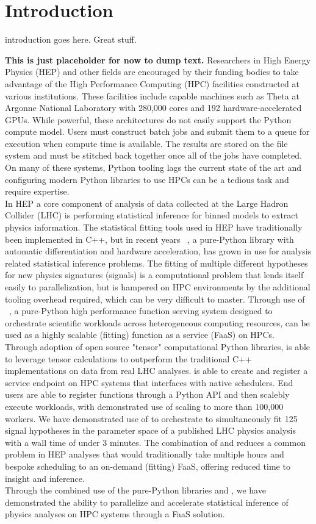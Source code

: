 \section{Introduction}\label{sec:introduction}
introduction goes here.
Great stuff.~\cite{ATL-PHYS-PUB-2019-029}

\textbf{This is just placeholder for now to dump text.}
Researchers in High Energy Physics (HEP) and other fields are encouraged by their funding bodies to take advantage of the High Performance Computing (HPC) facilities constructed at various institutions.
These facilities include capable machines such as Theta at Argonne National Laboratory with 280,000 cores and 192 hardware-accelerated GPUs.
While powerful, these architectures do not easily support the Python compute model.
Users must construct batch jobs and submit them to a queue for execution when compute time is available.
The results are stored on the file system and must be stitched back together once all of the jobs have completed.
On many of these systems, Python tooling lags the current state of the art and configuring modern Python libraries to use HPCs can be a tedious task and require expertise.\\

In HEP a core component of analysis of data collected at the Large Hadron Collider (LHC) is performing statistical inference for binned models to extract physics information.
The statistical fitting tools used in HEP have traditionally been implemented in C++, but in recent years \pyhf{}~\cite{pyhf,pyhf_joss}, a pure-Python library with automatic differentiation and hardware acceleration, has grown in use for analysis related statistical inference problems.
The fitting of multiple different hypotheses for new physics signatures (signals) is a computational problem that lends itself easily to parallelization, but is hampered on HPC environments by the additional tooling overhead required, which can be very difficult to master.
Through use of \funcX{}~\cite{funcX_paper}, a pure-Python high performance function serving system designed to orchestrate scientific workloads across heterogeneous computing resources, \pyhf{} can be used as a highly scalable (fitting) function as a service (FaaS) on HPCs.\\

Through adoption of open source "tensor" computational Python libraries, \pyhf{} is able to leverage tensor calculations to outperform the traditional C++ implementations on data from real LHC analyses.
\funcX{} is able to create and register a service endpoint on HPC systems that interfaces with native schedulers.
End users are able to register functions through a Python API and then scalebly execute workloads, with demonstrated use of scaling to more than 100,000 workers.
We have demonstrated use of \funcX{} to orchestrate \pyhf{} to simultaneously fit 125 signal hypotheses in the parameter space of a published LHC physics analysis with a wall time of under 3 minutes.
The combination of \pyhf{} and \funcX{} reduces a common problem in HEP analyses that would traditionally take multiple hours and bespoke scheduling to an on-demand (fitting) FaaS, offering reduced time to insight and inference.\\

Through the combined use of the pure-Python libraries \funcX{} and \pyhf{}, we have demonstrated the ability to parallelize and accelerate statistical inference of physics analyses on HPC systems through a FaaS solution.
